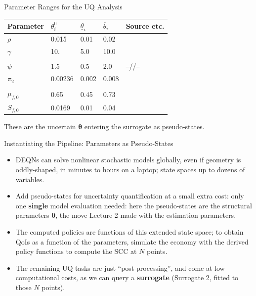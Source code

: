 \documentclass[aspectratio=169,11pt]{beamer}
\newcommand{\key}[1]{\textbf{\textcolor{uzhblue}{#1}}}
\newcommand{\keyc}[1]{\textcolor{uzhblue}{#1}}
\begin{document}
\begin{frame}[fragile]{Parameter Ranges for the UQ Analysis}
\begin{table}
\label{table:param_UQ}
\centering
\begin{tabularx}{\linewidth}{lllll}
\toprule
Parameter &  $\theta^{0}_{i}$ &
$\underline{\theta}_{i}$&  $\overline{\theta}_{i}$ & Source
  etc.\\
\midrule
$\rho$ & 0.015 & 0.01 & 0.02 & {\citet{stern2007economics}}\\
$\gamma$ & 10. & 5.0 & 10.0 & \makecell[l]{\citet{jensen_traeger_2014} and \\ \citet{Cai_Lontzek_2019}}\\
$\psi$ & 1.5 & 0.5 & 2.0 & --//-- \\
$\pi_{2}$ & 0.00236 & 0.002  & 0.008 & \makecell[l]{\citet{nordhaus2017revisiting} and \\ \citet{weitzman2012ghg}}\\
$\mu_{f,0}$  & 0.65 &  0.45 & 0.73 & \citet{roe2007climate}\\
$S_{f,0}$  & 0.0169 & 0.01 & 0.04 & \citet{roe2007climate}\\
\bottomrule
\end{tabularx}
\end{table}
\vspace{0.3em}
{\footnotesize These are the uncertain $\bm{\theta}$ entering the surrogate as pseudo-states.}
\end{frame}

\begin{frame}{Instantiating the Pipeline: Parameters as Pseudo-States}
\small
\begin{itemize}\itemsep4pt
\item  \keyc{DEQNs can solve nonlinear stochastic models globally, even if geometry is oddly-shaped, in minutes to hours on a laptop}; state spaces up to dozens of variables.
\item Add pseudo-states for uncertainty quantification at a small extra cost: \keyc{only one \textbf{single} model evaluation needed}: here the pseudo-states are the structural parameters $\bm{\theta}$, the move Lecture 2 made with the estimation parameters.
\item The computed policies are functions of this extended state space; to obtain QoIs as a function of the parameters, simulate the economy with the derived policy functions to compute the SCC at $N$ points.
\item The remaining UQ tasks are just ``post-processing'', and come at low computational costs, as we can query a \key{surrogate} (Surrogate 2, fitted to those $N$ points).
\end{itemize}
\end{frame}
\end{document}
